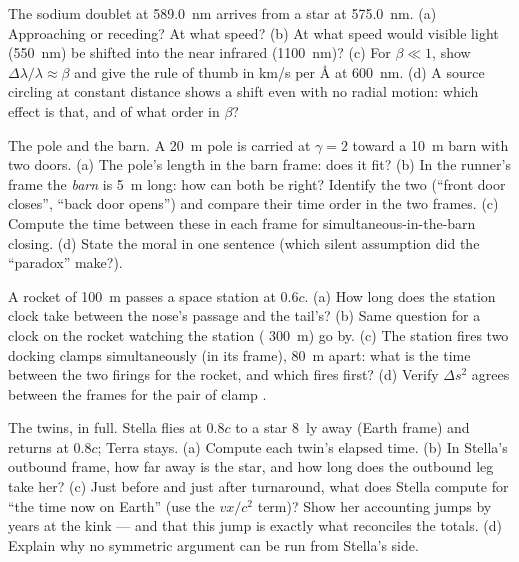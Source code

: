 \begin{exercise}[$\star\star$]\label{exo:b3:relativistic-kinematics:7}
The sodium doublet at \qty{589.0}{nm} arrives from a star at
\qty{575.0}{nm}. (a) Approaching or receding? At what speed? (b) At
what speed would visible light (\qty{550}{nm}) be shifted into the
near infrared (\qty{1100}{nm})? (c) For $\beta \ll 1$, show
$\Delta\lambda/\lambda \approx \beta$ and give the rule of thumb in
km/s per \unit{\angstrom} at \qty{600}{nm}. (d) A source circling at
constant distance shows a shift even with no radial motion: which
effect is that, and of what order in $\beta$?
\end{exercise}

\begin{exercise}[$\star\star$]\label{exo:b3:relativistic-kinematics:8}
The pole and the barn. A \qty{20}{m} pole is carried at $\gamma = 2$
toward a \qty{10}{m} barn with two doors. (a) The pole's length in the
barn frame: does it fit? (b) In the runner's frame the \emph{barn} is
\qty{5}{m} long: how can both be right? Identify the two 
(``front door closes'', ``back door opens'') and compare their time
order in the two frames. (c) Compute the time between these  in
each frame for simultaneous-in-the-barn closing. (d) State the moral
in one sentence (which silent assumption did the ``paradox'' make?).
\end{exercise}

\begin{exercise}[$\star\star$]\label{exo:b3:relativistic-kinematics:9}
A rocket of  \qty{100}{m} passes a space station at
$0.6c$. (a) How long does the station clock take between the nose's
passage and the tail's? (b) Same question for a clock on the rocket
watching the station ( \qty{300}{m}) go by. (c) The
station fires two docking clamps simultaneously (in its frame),
\qty{80}{m} apart: what is the time between the two firings for the
rocket, and which fires first? (d) Verify $\Delta s^2$ agrees between
the frames for the pair of clamp .
\end{exercise}

\begin{exercise}[$\star\star\star$]\label{exo:b3:relativistic-kinematics:10}
The twins, in full. Stella flies at $0.8c$ to a star \qty{8}{ly} away
(Earth frame) and returns at $0.8c$; Terra stays. (a) Compute each
twin's elapsed time. (b) In Stella's outbound frame, how far away is
the star, and how long does the outbound leg take her? (c) Just
before and just after turnaround, what does Stella compute for ``the
time now on Earth'' (use the $vx/c^2$ term)? Show her accounting jumps
by years at the kink --- and that this jump is exactly what reconciles
the totals. (d) Explain why no symmetric argument can be run from
Stella's side.
\end{exercise}

